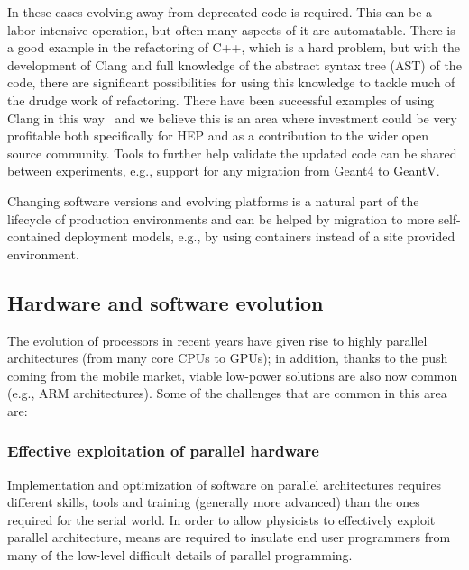 \documentclass[12pt,a4paper]{article}
\begin{document}
In these cases evolving away from deprecated code is required. This can
be a labor intensive operation, but often many aspects of it are
automatable. There is a good example in the refactoring of C++, which is
a hard problem, but with the development of Clang and full knowledge of
the abstract syntax tree (AST) of the code, there are significant
possibilities for using this knowledge to tackle much of the drudge work
of refactoring. There have been successful examples of using Clang in
this way~\cite{ClangMR41342}
and we believe this is an area where investment could be very profitable
both specifically for HEP and as a contribution to the wider open source
community. Tools to further help validate the updated code can be shared
between experiments, e.g., support for any migration from Geant4 to
GeantV.

Changing software versions and evolving platforms is a natural part of
the lifecycle of production environments and can be helped by migration
to more self-contained deployment models, e.g., by using containers
instead of a site provided environment.

\hypertarget{hardware-and-software-evolution}{%
\subsection{Hardware and software
evolution}\label{hardware-and-software-evolution}}

The evolution of processors in recent years have given rise to highly
parallel architectures (from many core CPUs to GPUs); in addition,
thanks to the push coming from the mobile market, viable low-power
solutions are also now common (e.g., ARM architectures). Some of the
challenges that are common in this area are:

\hypertarget{effective-exploitation-of-parallel-hardware}{%
\subsubsection{Effective exploitation of parallel
hardware}\label{effective-exploitation-of-parallel-hardware}}

Implementation and optimization of software on parallel architectures
requires different skills, tools and training (generally more advanced)
than the ones required for the serial world. In order to allow
physicists to effectively exploit parallel architecture, means are
required to insulate end user programmers from many of the low-level
difficult details of parallel programming.
\end{document}
